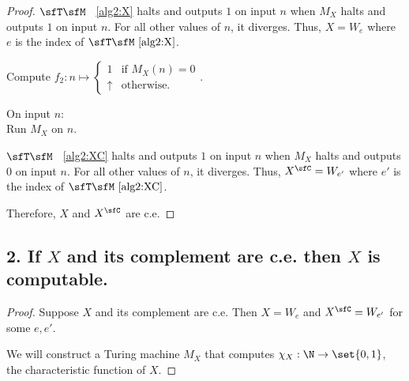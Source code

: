 \begin{problem}
\begin{answer}
\begin{proof}
        \step
        $\sfT \sfM$ ~\ref{alg2:X} halts and outputs $1$ on input $n$ when
        $M_X$ halts and outputs $1$ on input $n$.
        For all other values of $n$, it diverges.
        Thus, $X = W_e$ where $e$ is the index of $\sfT \sfM~\ref{alg2:X}$.
        
        \begin{algorithm}[H]\label{alg2:XC}
          \caption{Compute $f_2 : n \mapsto \begin{cases}
            1 & \text{if } M_X(n) = 0 \\
            \uparrow & \text{otherwise.}
          \end{cases}$.}
          On input $n$: \\
          Run $M_X$ on $n$. \\
        \end{algorithm}

        \step
        $\sfT \sfM$ ~\ref{alg2:XC} halts and outputs $1$ on input $n$ when
        $M_X$ halts and outputs $0$ on input $n$.
        For all other values of $n$, it diverges.
        Thus, $X^\sfC = W_{e'}$ where $e'$ is the index of $\sfT \sfM~\ref{alg2:XC}$.

        \step
        Therefore, $X$ and $X^\sfC$ are c.e.
      \end{proof}


    \subsection*{2. If $X$ and its complement are c.e. then $X$ is computable.}

      \begin{proof}
        Suppose $X$ and its complement are c.e.
        Then $X = W_e$ and $X^\sfC = W_{e'}$ for some $e, e'$.

        We will construct a Turing machine $M_X$ that computes $\chi_X : \N \to \set{0, 1}$,
        the characteristic function of $X$.


\end{proof}
\end{answer}
\end{problem}
